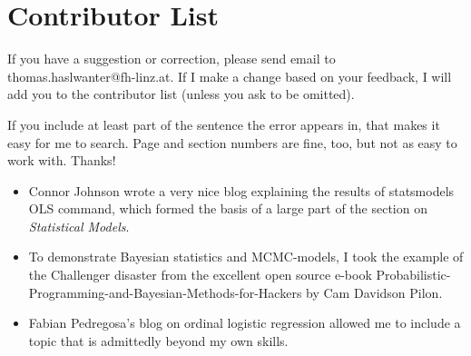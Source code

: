 \section*{Contributor List}

If you have a suggestion or correction, please send email to
thomas.haslwanter@fh-linz.at. If I make a change based on your feedback,
I will add you to the contributor list (unless you ask to be omitted).

If you include at least part of the sentence the error appears in, that
makes it easy for me to search. Page and section numbers are fine, too,
but not as easy to work with. Thanks!

\begin{itemize}
  \item Connor Johnson wrote a very nice blog explaining the results of
  statsmodels OLS command, which formed the basis of a large part of the
  section on \emph{Statistical Models}.

  \item To demonstrate Bayesian statistics and MCMC-models, I took the example of the Challenger disaster from the excellent open source e-book Probabilistic-Programming-and-Bayesian-Methods-for-Hackers by Cam Davidson Pilon.
  
  \item Fabian Pedregosa's blog on ordinal logistic regression allowed me to include a topic that is admittedly beyond my own skills.
\end{itemize}
